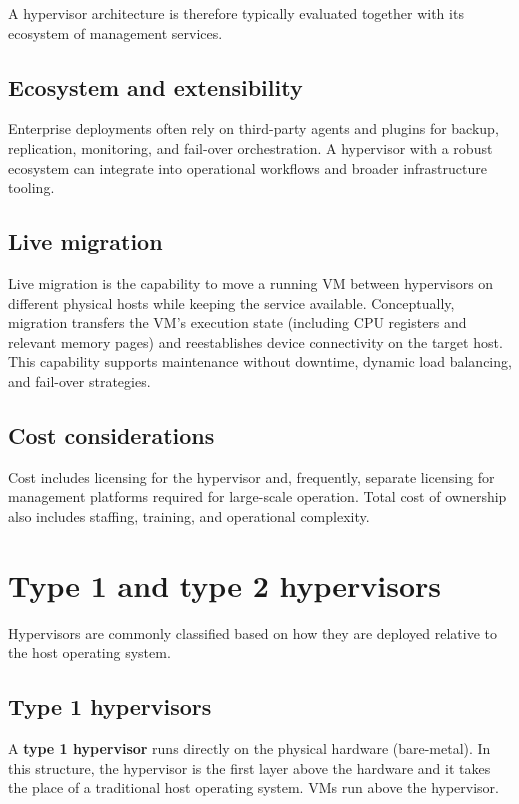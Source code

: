 \documentclass[11pt,a4paper,openany]{report}
\begin{document}
A hypervisor architecture is therefore typically evaluated together with its ecosystem of management services.

\subsection{Ecosystem and extensibility}

Enterprise deployments often rely on third-party agents and plugins for backup, replication, monitoring, and fail-over orchestration. A hypervisor with a robust ecosystem can integrate into operational workflows and broader infrastructure tooling.

\subsection{Live migration}

Live migration is the capability to move a running VM between hypervisors on different physical hosts while keeping the service available. Conceptually, migration transfers the VM's execution state (including CPU registers and relevant memory pages) and reestablishes device connectivity on the target host. This capability supports maintenance without downtime, dynamic load balancing, and fail-over strategies.

\subsection{Cost considerations}

Cost includes licensing for the hypervisor and, frequently, separate licensing for management platforms required for large-scale operation. Total cost of ownership also includes staffing, training, and operational complexity.

\section{Type 1 and type 2 hypervisors}

Hypervisors are commonly classified based on how they are deployed relative to the host operating system.

\subsection{Type 1 hypervisors}

A \textbf{type 1 hypervisor} runs directly on the physical hardware (bare-metal). In this structure, the hypervisor is the first layer above the hardware and it takes the place of a traditional host operating system. VMs run above the hypervisor.
\end{document}
